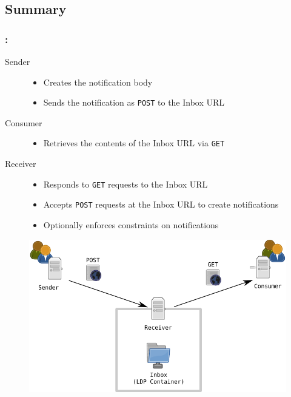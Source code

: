 \documentclass[aspectratio=169,hideallsubsections]{beamer}
\begin{document}
\subsection{Summary}
\begin{frame}
  \frametitle{\insertsection: \insertsubsection}%
  
  \begin{description}
    \item[Sender]
    \begin{itemize}
     \item Creates the notification body
     \item Sends the notification as \texttt{POST} to the Inbox URL
    \end{itemize}
 
    \item[Consumer]
    \begin{itemize}
     \item Retrieves the contents of the Inbox URL via \texttt{GET}
    \end{itemize}
    \item[Receiver]
    \begin{itemize}
     \item Responds to \texttt{GET} requests to the Inbox URL
     \item Accepts \texttt{POST} requests at the Inbox URL to create notifications
     \item Optionally enforces constraints on notifications
    \end{itemize}
  \end{description}
  
    \begin{figure}
     \begin{center}
     \includegraphics[width=.4\textwidth]{LingedDataNotifications/LDN-overview-1}
     \end{center}
    \end{figure}
  
\end{frame}
\end{document}
